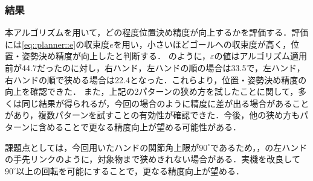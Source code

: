 \documentclass[a4paper,twoside,12pt,papersize, dvipdfmx]{iirthesis}
\begin{document}
\subsubsection{結果}
本アルゴリズムを用いて，どの程度位置決め精度が向上するかを評価する．評価には\eqref{eq::planner::e}の収束度$e$を用い，小さいほどゴールへの収束度が高く，位置・姿勢決め精度が向上したと判断する．
のように，$\varepsilon$の値はアルゴリズム適用前が44.7だったのに対し，右ハンド，左ハンドの順の場合は33.5で，左ハンド，右ハンドの順で狭める場合は22.4となった．これらより，位置・姿勢決め精度の向上を確認できた．
また，上記の2パターンの狭め方を試したことに関して，多くは同じ結果が得られるが，今回の場合のように精度に差が出る場合があることがあり，複数パターンを試すことの有効性が確認できた．今後，他の狭め方もパターンに含めることで更なる精度向上が望める可能性がある．　\par
課題点としては，今回用いたハンドの関節角上限が$90^{\circ}$であるため，，の左ハンドの手先リンクのように，対象物まで狭めきれない場合がある．実機を改良して$90^{\circ}$以上の回転を可能にすることで，更なる精度向上が望める．
\end{document}
